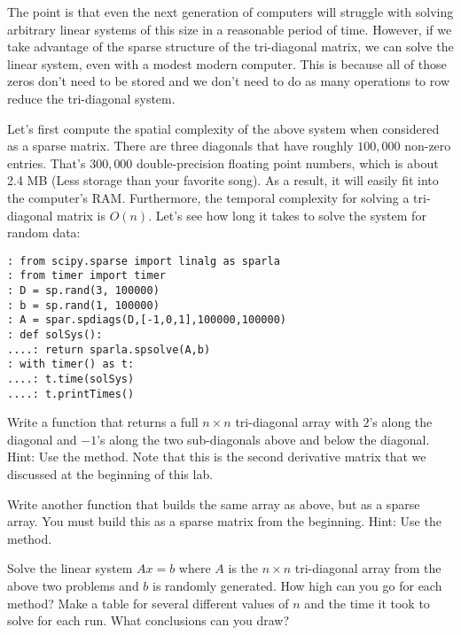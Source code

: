 The point is that even the next generation of computers will
struggle with solving arbitrary linear systems of this size in a
reasonable period of time.  However, if we take advantage of the
sparse structure of the tri-diagonal matrix, we can solve the linear
system, even with a modest modern computer.  This is because all of
those zeros don't need to be stored and we don't need to do as many
operations to row reduce the tri-diagonal system.

Let's first compute the spatial complexity of the above system when
considered as a sparse matrix.  There are three diagonals that have
roughly $100,\!000$ non-zero entries.  That's $300,\!000$
double-precision floating point numbers, which is about 2.4 MB (Less
storage than your favorite song).  As a result, it will easily
fit into the computer's RAM.  Furthermore, the temporal complexity for solving
a tri-diagonal matrix is $O(n)$. Let's see how long it takes to
solve the system for random data:

\begin{lstlisting}[style=python]
: from scipy.sparse import linalg as sparla
: from timer import timer
: D = sp.rand(3, 100000)
: b = sp.rand(1, 100000)
: A = spar.spdiags(D,[-1,0,1],100000,100000)
: def solSys():
....: return sparla.spsolve(A,b)
: with timer() as t:
....: t.time(solSys)
....: t.printTimes()
\end{lstlisting}

\begin{problem}
Write a function that returns a full $n\times n$
tri-diagonal array with $2$'s along the diagonal and $-1$'s along
the two sub-diagonals above and below the diagonal. Hint: Use the  method. Note that this is the second derivative matrix that we discussed at the beginning of this lab.
\end{problem}

\begin{problem}
Write another function that builds the same array as above, but as a sparse array. You must build this as a sparse matrix from the beginning. Hint: Use the  method.
\end{problem}

\begin{problem}
Solve the linear system $Ax = b$ where $A$ is the $n\times n$
tri-diagonal array from the above two problems and $b$ is randomly
generated.  How high can you go for each method?  Make a table for
several different values of $n$ and the time it took to solve for
each run.  What conclusions can you draw?
\end{problem}

